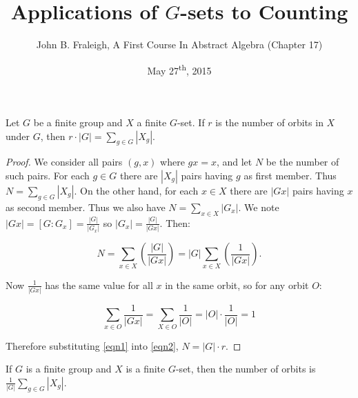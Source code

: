 \documentclass[a4paper,11pt]{article}
\title{Applications of \(G\)-sets to Counting}
\author{John B. Fraleigh, A First Course In Abstract Algebra (Chapter 17)}
\date{May 27\textsuperscript{th}, 2015}
\begin{document}
\maketitle
{}

\begin{outline}

    Let \(G\) be a finite group and \(X\) a finite \(G\)-set. If \(r\) is the number of orbits in \(X\) 
    under \(G\), then \(r \cdot |G| = \sum_{g \in G}|X_g|\).
    
    \begin{proof}
      We consider all pairs \((g, x)\) where \(gx = x\), and let \(N\) be the number of such pairs. For each
      \(g \in G\) there are \(|X_g|\) pairs having \(g\) as first member. Thus \(N = \sum_{g \in G}|X_g|\).
      On the other hand, for each \(x \in X\) there are \(|Gx|\) pairs having \(x\) as second member. Thus we also
      have \(N = \sum_{x \in X} |G_x|\). We note \(|Gx| = [G:G_x] = \frac{|G|}{|G_x|}\) so \(|G_x| = \frac{|G|}{|Gx|}\).
      Then:
      
      \begin{equation}
        \label{eqn1}
        N = \sum_{x \in X}(\frac{|G|}{|Gx|}) = |G|\sum_{x \in X} (\frac{1}{|Gx|}).
      \end{equation}
      
      Now \(\frac{1}{|Gx|}\) has the same value for all \(x\) in the same orbit, so for any orbit \(O\):
      
      \begin{equation}
        \label{eqn2}
        \sum_{x \in O} \frac{1}{|Gx|} = \sum_{X \in O} \frac{1}{|O|} = |O| \cdot \frac{1}{|O|} = 1
      \end{equation}
      
      Therefore substituting \eqref{eqn1} into \eqref{eqn2}, \(N = |G| \cdot r\).
    \end{proof}

    If \(G\) is a finite group and \(X\) is a finite \(G\)-set, then the number of orbits is 
    \(\frac{1}{|G|}\sum_{g \in G}|X_g|\).

\end{outline}
\end{document}
